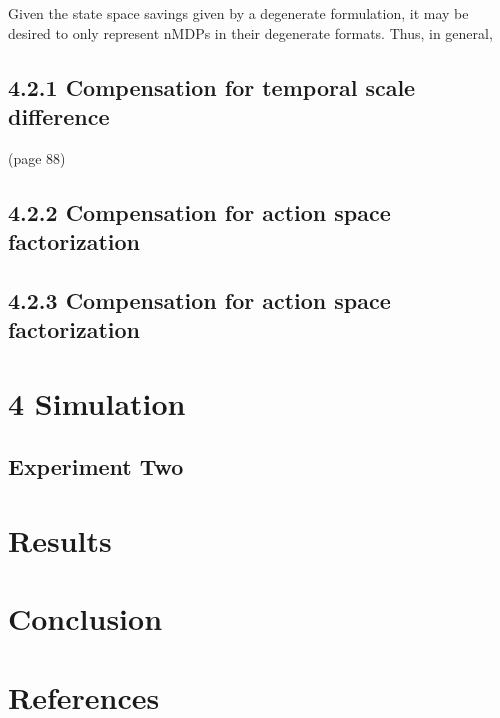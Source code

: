 \documentclass[]{article}
\begin{document}
Given the state space savings given by a degenerate formulation, it may
be desired to only represent nMDPs in their degenerate formats. Thus, in
general,

\subsection{4.2.1 Compensation for temporal scale
difference}\label{compensation-for-temporal-scale-difference}

(page 88)

\subsection{4.2.2 Compensation for action space
factorization}\label{compensation-for-action-space-factorization}

\subsection{4.2.3 Compensation for action space
factorization}\label{compensation-for-action-space-factorization-1}

\section{}\label{section-1}

\section{4 Simulation}\label{simulation-1}

\subsection{Experiment Two}\label{experiment-two}

\section{Results}\label{results}

\section{Conclusion}\label{conclusion}

\section{References}\label{references}
\end{document}
